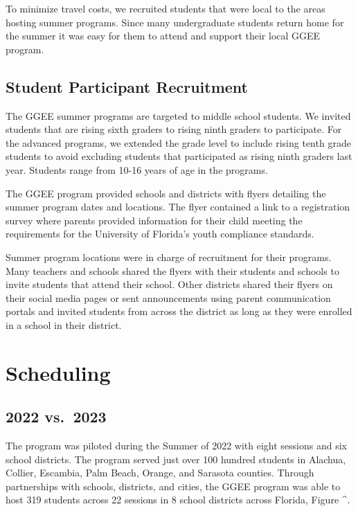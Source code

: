 \documentclass[
]{article}
\begin{document}
To minimize travel costs, we recruited students that were local to the
areas hosting summer programs. Since many undergraduate students return
home for the summer it was easy for them to attend and support their
local GGEE program.

\hypertarget{student-participant-recruitment}{%
\subsection{Student Participant
Recruitment}\label{student-participant-recruitment}}

The GGEE summer programs are targeted to middle school students. We
invited students that are rising sixth graders to rising ninth graders
to participate. For the advanced programs, we extended the grade level
to include rising tenth grade students to avoid excluding students that
participated as rising ninth graders last year. Students range from
10-16 years of age in the programs.

The GGEE program provided schools and districts with flyers detailing
the summer program dates and locations. The flyer contained a link to a
registration survey where parents provided information for their child
meeting the requirements for the University of Florida's youth
compliance standards.

Summer program locations were in charge of recruitment for their
programs. Many teachers and schools shared the flyers with their
students and schools to invite students that attend their school. Other
districts shared their flyers on their social media pages or sent
announcements using parent communication portals and invited students
from across the district as long as they were enrolled in a school in
their district.

\hypertarget{scheduling}{%
\section{Scheduling}\label{scheduling}}

\hypertarget{vs.-2023}{%
\subsection{2022 vs.~2023}\label{vs.-2023}}

The program was piloted during the Summer of 2022 with eight sessions
and six school districts. The program served just over 100 hundred
students in Alachua, Collier, Escambia, Palm Beach, Orange, and Sarasota
counties. Through partnerships with schools, districts, and cities, the
GGEE program was able to host 319 students across 22 sessions in 8
school districts across Florida, Figure \^{}.
\end{document}
